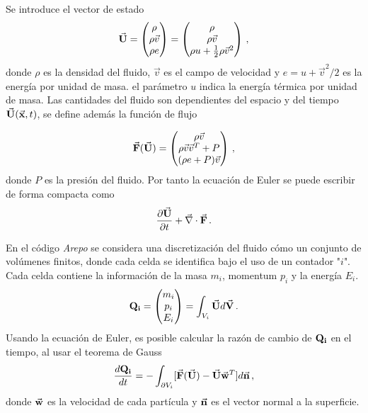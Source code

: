 Se introduce el vector de estado    
\begin{align}
    \vec{\bf{U}}= \begin{pmatrix} \rho \\ \rho\vec{v} \\ \rho e \end{pmatrix} = 
    \begin{pmatrix} \rho \\ \rho\vec{v} \\ \rho u+\frac{1}{2}\rho\vec{v}^{2} \end{pmatrix}\,,
\end{align}
donde $\rho$ es la densidad del fluido, $\vec{v}$ es el campo de velocidad y $e=u+ \vec{v}^{2}/2$ es la energía por unidad de masa. el parámetro $u$ indica la energía térmica por unidad de masa. Las cantidades del fluido son dependientes del espacio y del tiempo $\vec{\bf{U}}(\vec{\bf{x}},t)$, se define además la función de flujo

\begin{align}
    \vec{\bf{F}}(\vec{\bf{U}})=
    \begin{pmatrix} \rho\vec{v} \\ \rho\vec{v}\vec{v}^{T}+ P \\ (\rho e + P)\vec{v} \end{pmatrix}\,,
\end{align}
donde $P$ es la presión del fluido. Por tanto  la ecuación de Euler se puede escribir de forma compacta como 
\begin{align}
    \frac{\partial\vec{\bf{U}}}{\partial t} + \vec{\nabla}\cdot \vec{\bf{F}}\,.
\end{align}

En el código {\it{Arepo}} se considera una discretización del fluido cómo un conjunto de volúmenes finitos, donde cada celda se identifica bajo el uso de un contador "$i$". Cada celda contiene la información de la masa $m_{i}$, momentum $p_{i}$ y la energía $E_{i}$. %
\begin{align}
    {\bf{Q}_{i}} = \begin{pmatrix} m_{i} \\ p_{i} \\ E_{i} \end{pmatrix} = \int_{V_{i}} \vec{\bf{U}}d\vec{\bf{V}}\,.
\end{align}
%
Usando la ecuación de Euler, es posible calcular la razón de cambio de ${\bf{Q}_{i}}$ en el tiempo, al usar el teorema de Gauss
\begin{align}
    \frac{d{\bf{Q_{i}}}}{dt} = -\int_{\partial V_{i}}[\vec{\bf{F}}(\vec{\bf{U}})-\vec{\bf{U}}\vec{\bf{w}}^{T}]d\vec{\bf{n}}\,,
\end{align}
donde $\vec{\bf{w}}$ es la velocidad de cada partícula y $\vec{\bf{n}}$ es el vector normal a la superficie.

